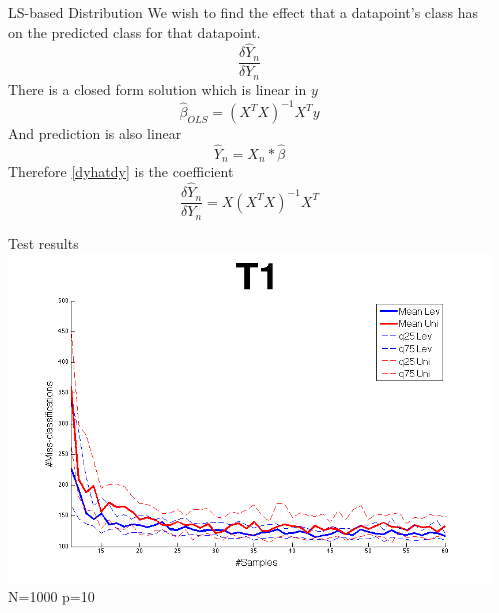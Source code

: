 \documentclass{beamer}
\newenvironment{pblock}{\begin{minipage}[b]{\linewidth}
	\begin{block}}{\end{block} 	\end{minipage}\vspace*{15pt}}
\begin{document}
{\begin{columns}[t]
\begin{column}{.3\linewidth}
	\begin{pblock}{LS-based Distribution}	
	We wish to find the effect that a datapoint's class has on the predicted class for that datapoint.
	    \begin{equation}
	    \label{dyhatdy}
	    \frac{\delta \hat{Y}_n}{\delta Y_n}
	    \end{equation}
	There is a closed form solution which is linear in $y$
		\begin{equation*}
			\hat{\beta}_{OLS} = \left( X^T X \right)^{-1} X^T y
		\end{equation*}
	And prediction is also linear
		\begin{equation*}
			\hat{Y}_n = X_n*\hat{\beta}
		\end{equation*}
	Therefore \eqref{dyhatdy} is the coefficient
		\begin{equation*}
			\frac{\delta \hat{Y}_n}{\delta Y_n} = X \left( X^T X \right)^{-1} X^T
		\end{equation*}
	
	\end{pblock}

	\begin{pblock}{Test results}
	\includegraphics[width=\linewidth]{T1.png}
	N=1000 p=10
	\end{pblock}

	
	
    \end{column}
    \begin{column}{.3\linewidth}
    

\end{column}
\end{columns}}
\end{document}
